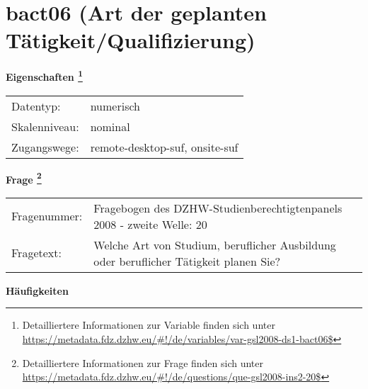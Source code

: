 
    \setcounter{footnote}{0}

    \vspace*{-1.8cm}
	\section{bact06 (Art der geplanten Tätigkeit/Qualifizierung)}
	\label{section:bact06}



    \vspace*{0.5cm}
    \noindent\textbf{Eigenschaften
	\footnote{Detailliertere Informationen zur Variable finden sich unter
		\url{https://metadata.fdz.dzhw.eu/\#!/de/variables/var-gsl2008-ds1-bact06$}}}\\
	\begin{tabularx}{\hsize}{@{}lX}
	Datentyp: & numerisch \\
	Skalenniveau: & nominal \\
	Zugangswege: &
	  remote-desktop-suf, 
	  onsite-suf
 \\
    \end{tabularx}



				\vspace*{0.5cm}
                \noindent\textbf{Frage
	                \footnote{Detailliertere Informationen zur Frage finden sich unter
		              \url{https://metadata.fdz.dzhw.eu/\#!/de/questions/que-gsl2008-ins2-20$}}}\\
				\begin{tabularx}{\hsize}{@{}lX}
					Fragenummer: &
					  Fragebogen des DZHW-Studienberechtigtenpanels 2008 - zweite Welle:
					  20
 \\
					Fragetext: & Welche Art von Studium, beruflicher Ausbildung oder beruflicher Tätigkeit planen Sie? \\
				\end{tabularx}





        		\vspace*{0.5cm}
                \noindent\textbf{Häufigkeiten}


